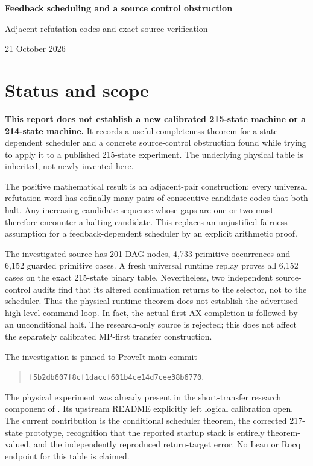\documentclass[11pt]{article}
\newcommand{\file}[1]{{\small\path{#1}}}
\begin{document}
{\LARGE\bfseries Feedback scheduling and a source control obstruction}\par
\vspace{5pt}
{\large Adjacent refutation codes and exact source verification}\par
21 October 2026\par

\section{Status and scope}
\textbf{This report does not establish a new calibrated 215-state machine or a 214-state machine.} It records a useful completeness theorem for a state-dependent scheduler and a concrete source-control obstruction found while trying to apply it to a published 215-state experiment. The underlying physical table is inherited, not newly invented here.

The positive mathematical result is an adjacent-pair construction: every universal refutation word has cofinally many pairs of consecutive candidate codes that both halt. Any increasing candidate sequence whose gaps are one or two must therefore encounter a halting candidate. This replaces an unjustified fairness assumption for a feedback-dependent scheduler by an explicit arithmetic proof.

The investigated source has 201 DAG nodes, 4,733 primitive occurrences and 6,152 guarded primitive cases. A fresh universal runtime replay proves all 6,152 cases on the exact 215-state binary table. Nevertheless, two independent source-control audits find that its altered continuation returns to the selector, not to the scheduler. Thus the physical runtime theorem does not establish the advertised high-level command loop. In fact, the actual first AX completion is followed by an unconditional halt. The research-only source is rejected; this does not affect the separately calibrated MP-first transfer construction.

The investigation is pinned to ProveIt main commit
\begin{quote}\small\ttfamily
\nolinkurl{f5b2db607f8cf1daccf601b4ce14d7cee38b6770}.
\end{quote}
The physical experiment was already present in the short-transfer research component of \file{T215_Transfer_2026-10-20.zip}. Its upstream README explicitly left logical calibration open. The current contribution is the conditional scheduler theorem, the corrected 217-state prototype, recognition that the reported startup stack is entirely theorem-valued, and the independently reproduced return-target error. No Lean or Rocq endpoint for this table is claimed.
\end{document}
